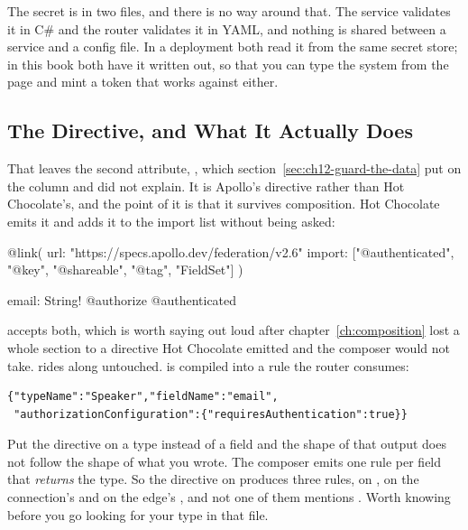 %
The secret is in two files, and there is no way around that. The service
validates it in C\# and the router validates it in YAML, and nothing is
shared between a service and a config file. In a deployment both read it from
the same secret store; in this book both have it written out, so that you can
type the system from the page and mint a token that works against either.

\subsection{The Directive, and What It Actually Does}

%
That leaves the second attribute,
\code{[Authenticated]}, which section~\ref{sec:ch12-guard-the-data} put on
the column and did not explain. It is Apollo's directive rather than Hot
Chocolate's, and the point of it is that it survives composition. Hot
Chocolate emits it and adds it to the import list without being asked:

\begin{graphqlsdl}[fontsize=\footnotesize]
@link(
  url: "https://specs.apollo.dev/federation/v2.6"
  import: ["@authenticated", "@key", "@shareable", "@tag", "FieldSet"]
)
\end{graphqlsdl}

\begin{graphqlsdl}[fontsize=\footnotesize]
email: String! @authorize @authenticated
\end{graphqlsdl}

%
 accepts both, which is worth saying out loud after
chapter~\ref{ch:composition} lost a whole section to a directive Hot
Chocolate emitted and the composer would not take.  rides
along untouched.  is compiled into a rule the router
consumes:

\begin{verbatim}
{"typeName":"Speaker","fieldName":"email",
 "authorizationConfiguration":{"requiresAuthentication":true}}
\end{verbatim}

%
Put the directive on a type instead of a field and the shape of that output
does not follow the shape of what you wrote. The composer emits one rule per
field that \emph{returns} the type. So the directive on 
produces three rules, on , on the connection's
 and on the edge's , and not one of them mentions
. Worth knowing before you go looking for your type in that
file.


